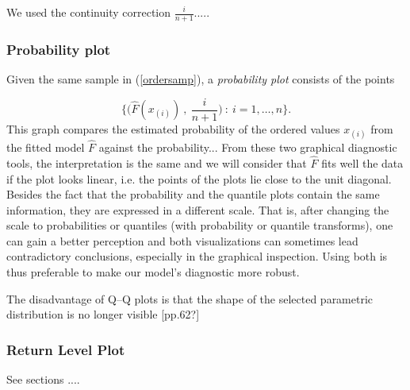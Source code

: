 \documentclass[11pt,a4paper,openany ]{book}
\begin{document}
We used the continuity correction $\frac{i}{n+1}$.....


\subsubsection*{Probability plot} Given the same sample in (\ref{ordersamp}), a \emph{probability plot} consists of the points 

\begin{equation}
\Bigg\{\bigg(\hat{F}(x_{(i)})\ ,\ \frac{i}{n+1}\bigg) \ : \ i=1,\dots,n\Bigg\}.
\end{equation}
This graph compares the estimated probability of the ordered values $x_{(i)}$ from the fitted model $\hat{F}$ against the probability...
\newline
From these two graphical diagnostic tools, the interpretation is the same and we will consider that $\hat{F}$ fits well the data if the plot looks linear, i.e. the points of the plots lie close to the unit diagonal.
\newline
Besides the fact that the probability and the quantile plots contain the same information, they are expressed in a different scale. That is, after changing the scale to probabilities or quantiles (with probability or quantile transforms), one can gain a better perception and both visualizations can sometimes lead contradictory conclusions, especially in the graphical inspection. Using both is thus preferable to make our model's diagnostic more robust.

The disadvantage of Q–Q plots is that the shape of the selected
parametric distribution is no longer visible \cite{beirlant_statistics_2006}[pp.62?]


\subsubsection*{Return Level Plot}

See sections ....
\end{document}
